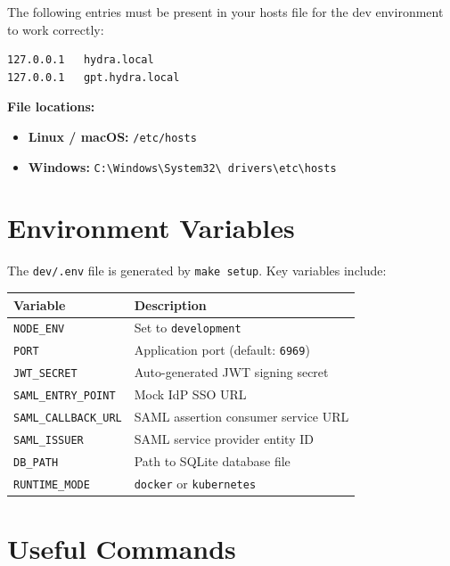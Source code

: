 \documentclass[11pt,a4paper]{article}
\newcommand{\cmdref}[1]{\texttt{#1}}
\begin{document}
The following entries must be present in your hosts file for the dev
environment to work correctly:

\begin{lstlisting}
127.0.0.1   hydra.local
127.0.0.1   gpt.hydra.local
\end{lstlisting}

\textbf{File locations:}
\begin{itemize}[leftmargin=2em]
    \item \textbf{Linux / macOS:} \cmdref{/etc/hosts}
    \item \textbf{Windows:}
          \cmdref{C:\textbackslash Windows\textbackslash System32\textbackslash
          drivers\textbackslash etc\textbackslash hosts}
\end{itemize}

\section{Environment Variables}
\label{app:envvars}

The \cmdref{dev/.env} file is generated by \cmdref{make setup}. Key
variables include:

\begin{center}
\begin{tabularx}{\textwidth}{l X}
    \toprule
    \textbf{Variable} & \textbf{Description} \\
    \midrule
    \texttt{NODE\_ENV} & Set to \texttt{development} \\
    \texttt{PORT} & Application port (default: \texttt{6969}) \\
    \texttt{JWT\_SECRET} & Auto-generated JWT signing secret \\
    \texttt{SAML\_ENTRY\_POINT} & Mock IdP SSO URL \\
    \texttt{SAML\_CALLBACK\_URL} & SAML assertion consumer service URL \\
    \texttt{SAML\_ISSUER} & SAML service provider entity ID \\
    \texttt{DB\_PATH} & Path to SQLite database file \\
    \texttt{RUNTIME\_MODE} & \texttt{docker} or \texttt{kubernetes} \\
    \bottomrule
\end{tabularx}
\end{center}

\section{Useful Commands}
\label{app:commands}
\end{document}

